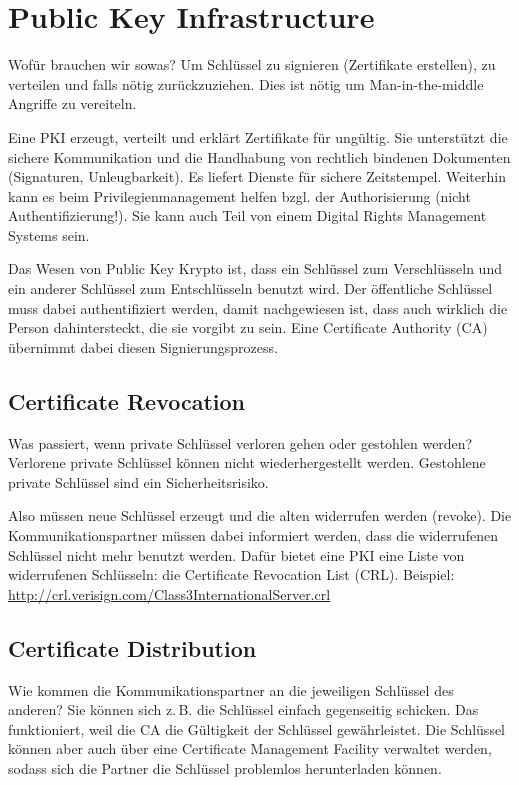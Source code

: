 \section{Public Key Infrastructure}%
\label{sec:public_key_infrastructure}

Wofür brauchen wir sowas?
Um Schlüssel zu signieren (Zertifikate erstellen), zu verteilen und falls nötig
zurückzuziehen.
Dies ist nötig um Man-in-the-middle Angriffe zu vereiteln.

Eine PKI erzeugt, verteilt und erklärt Zertifikate für ungültig.
Sie unterstützt die sichere Kommunikation und die Handhabung von rechtlich bindenen
Dokumenten (Signaturen, Unleugbarkeit).
Es liefert Dienste für sichere Zeitstempel.
Weiterhin kann es beim Privilegienmanagement helfen bzgl. der Authorisierung (nicht
Authentifizierung!).
Sie kann auch Teil von einem Digital Rights Management Systems sein.

Das Wesen von Public Key Krypto ist, dass ein Schlüssel zum Verschlüsseln und ein anderer
Schlüssel zum Entschlüsseln benutzt wird.
Der öffentliche Schlüssel muss dabei authentifiziert werden, damit nachgewiesen ist, dass
auch wirklich die Person dahintersteckt, die sie vorgibt zu sein.
Eine Certificate Authority (CA) übernimmt dabei diesen Signierungsprozess.

\subsection{Certificate Revocation}%
\label{sub:certificate_revocation}

Was passiert, wenn private Schlüssel verloren gehen oder gestohlen werden?
Verlorene private Schlüssel können nicht wiederhergestellt werden.
Gestohlene private Schlüssel sind ein Sicherheitsrisiko.

Also müssen neue Schlüssel erzeugt und die alten widerrufen werden (revoke).
Die Kommunikationspartner müssen dabei informiert werden, dass die widerrufenen Schlüssel
nicht mehr benutzt werden.
Dafür bietet eine PKI eine Liste von widerrufenen Schlüsseln: die Certificate Revocation
List (CRL).
Beispiel: \url{http://crl.verisign.com/Class3InternationalServer.crl}

\subsection{Certificate Distribution}%
\label{sub:certificate_distribution}

Wie kommen die Kommunikationspartner an die jeweiligen Schlüssel des anderen?
Sie können sich z.\,B. die Schlüssel einfach gegenseitig schicken.
Das funktioniert, weil die CA die Gültigkeit der Schlüssel gewährleistet.
Die Schlüssel können aber auch über eine Certificate Management Facility verwaltet werden,
sodass sich die Partner die Schlüssel problemlos herunterladen können.

